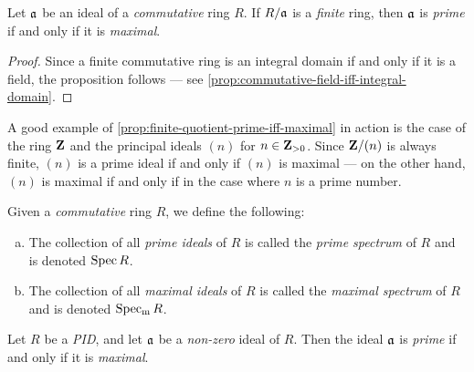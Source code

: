 \begin{proposition}
\label{prop:finite-quotient-prime-iff-maximal}
Let \(\mathfrak{a}\) be an ideal of a \emph{commutative} ring \(R\). If
\(R/\mathfrak{a}\) is a \emph{finite} ring, then \(\mathfrak{a}\) is \emph{prime} if
and only if it is \emph{maximal}.
\end{proposition}

\begin{proof}
Since a finite commutative ring is an integral domain if and only if it is a
field, the proposition follows --- see
\cref{prop:commutative-field-iff-integral-domain}.
\end{proof}

\begin{example}
\label{exp:Z/nZ-finite-quotient-prime-iff-maximal-iff-prime-number}
A good example of \cref{prop:finite-quotient-prime-iff-maximal} in action is the
case of the ring \(\mathbf{Z}\) and the principal ideals \((n)\) for
\(n \in \mathbf{Z}_{> 0}\). Since \(\mathbf{Z}/(n)\) is always finite, \((n)\) is a prime ideal
if and only if \((n)\) is maximal --- on the other hand, \((n)\) is maximal if
and only if in the case where \(n\) is a prime number.
\end{example}

\begin{definition}
\label{def:ring-spectrum}
Given a \emph{commutative} ring \(R\), we define the following:
\begin{enumerate}[(a)]\setlength\itemsep{0em}
\item The collection of all \emph{prime ideals} of \(R\) is called the
  \emph{prime spectrum} of \(R\) and is denoted \(\operatorname{Spec} R\).

\item The collection of all \emph{maximal ideals} of \(R\) is called the
  \emph{maximal spectrum} of \(R\) and is denoted \(\operatorname{Spec_m} R\).
\end{enumerate}
\end{definition}

\begin{proposition}
\label{prop:PID-prime-iff-maximal}
Let \(R\) be a \emph{PID}, and let \(\mathfrak{a}\) be a \emph{non-zero} ideal of
\(R\). Then the ideal \(\mathfrak{a}\) is \emph{prime} if and only if it is
\emph{maximal}.
\end{proposition}

